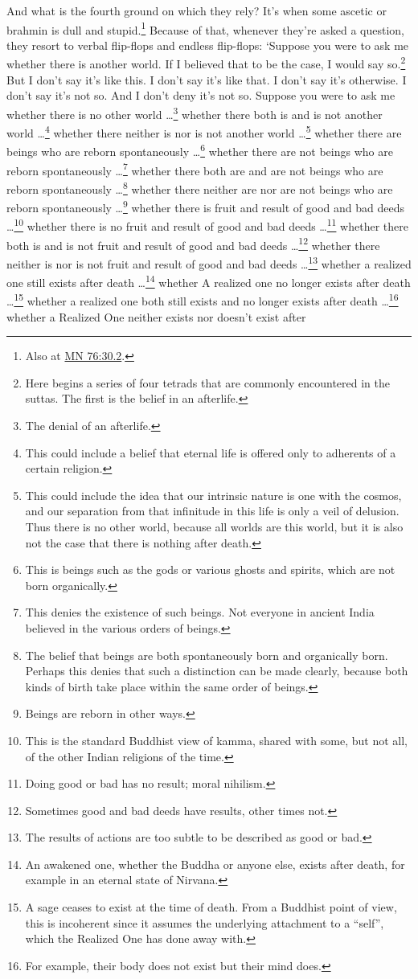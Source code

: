 \documentclass[12pt,openany]{book}%
\begin{document}
And what is the fourth ground on which they rely? It’s when some ascetic or brahmin is dull and stupid.\footnote{Also at \href{https://suttacentral.net/mn76/en/sujato\#30.2}{MN 76:30.2}. } Because of that, whenever they’re asked a question, they resort to verbal flip-flops and endless flip-flops: ‘Suppose you were to ask me whether there is another world. If I believed that to be the case, I would say so.\footnote{Here begins a series of four tetrads that are commonly encountered in the suttas. The first is the belief in an afterlife. } But I don’t say it’s like this. I don’t say it’s like that. I don’t say it’s otherwise. I don’t say it’s not so. And I don’t deny it’s not so. Suppose you were to ask me whether there is no other world …\footnote{The denial of an afterlife. } whether there both is and is not another world …\footnote{This could include a belief that eternal life is offered only to adherents of a certain religion. } whether there neither is nor is not another world …\footnote{This could include the idea that our intrinsic nature is one with the cosmos, and our separation from that infinitude in this life is only a veil of delusion. Thus there is no other world, because all worlds are this world, but it is also not the case that there is nothing after death. } whether there are beings who are reborn spontaneously …\footnote{This is beings such as the gods or various ghosts and spirits, which are not born organically. } whether there are not beings who are reborn spontaneously …\footnote{This denies the existence of such beings. Not everyone in ancient India believed in the various orders of beings. } whether there both are and are not beings who are reborn spontaneously …\footnote{The belief that beings are both spontaneously born and organically born. Perhaps this denies that such a distinction can be made clearly, because both kinds of birth take place within the same order of beings. } whether there neither are nor are not beings who are reborn spontaneously …\footnote{Beings are reborn in other ways. } whether there is fruit and result of good and bad deeds …\footnote{This is the standard Buddhist view of kamma, shared with some, but not all, of the other Indian religions of the time. } whether there is no fruit and result of good and bad deeds …\footnote{Doing good or bad has no result; moral nihilism. } whether there both is and is not fruit and result of good and bad deeds …\footnote{Sometimes good and bad deeds have results, other times not. } whether there neither is nor is not fruit and result of good and bad deeds …\footnote{The results of actions are too subtle to be described as good or bad. } whether a realized one still exists after death …\footnote{An awakened one, whether the Buddha or anyone else, exists after death, for example in an eternal state of Nirvana. } whether A realized one no longer exists after death …\footnote{A sage ceases to exist at the time of death. From a Buddhist point of view, this is incoherent since it assumes the underlying attachment to a “self”, which the Realized One has done away with. } whether a realized one both still exists and no longer exists after death …\footnote{For example, their body does not exist but their mind does. } whether a Realized One neither exists nor doesn’t exist after 
\end{document}
